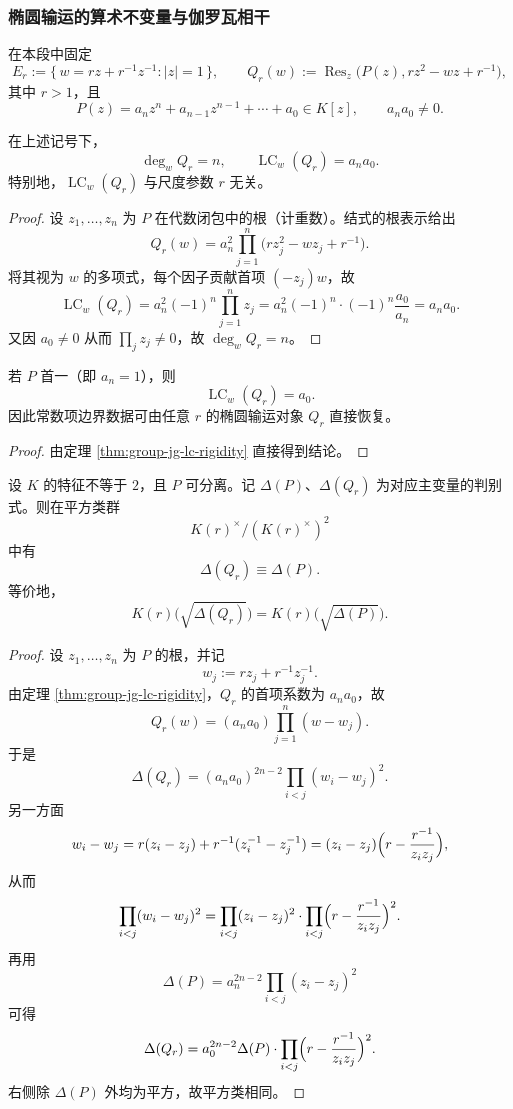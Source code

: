 \subsubsection{椭圆输运的算术不变量与伽罗瓦相干}\label{subsubsec:group-jg-arithmetic-galois-coherence}

在本段中固定
\[
E_r:=\{\,w=r z+r^{-1}z^{-1}:|z|=1\,\},\qquad
Q_r(w):=\operatorname{Res}_{z}\!\bigl(P(z),r z^2-w z+r^{-1}\bigr),
\]
其中 \(r>1\)，且
\[
P(z)=a_n z^n+a_{n-1}z^{n-1}+\cdots+a_0\in K[z],\qquad a_n a_0\neq 0.
\]



\begin{theorem}[输运结式首项系数刚性]\label{thm:group-jg-lc-rigidity}
在上述记号下，
\[
\deg_w Q_r=n,\qquad \operatorname{LC}_w(Q_r)=a_n a_0.
\]
特别地，\(\operatorname{LC}_w(Q_r)\) 与尺度参数 \(r\) 无关。
\end{theorem}
\begin{proof}
设 \(z_1,\dots,z_n\) 为 \(P\) 在代数闭包中的根（计重数）。结式的根表示给出
\[
Q_r(w)=a_n^2\prod_{j=1}^{n}\bigl(r z_j^2-w z_j+r^{-1}\bigr).
\]
将其视为 \(w\) 的多项式，每个因子贡献首项 \((-z_j)w\)，故
\[
\operatorname{LC}_w(Q_r)
=a_n^2(-1)^n\prod_{j=1}^{n}z_j
=a_n^2(-1)^n\cdot(-1)^n\frac{a_0}{a_n}
=a_n a_0.
\]
又因 \(a_0\neq 0\) 从而 \(\prod_j z_j\neq 0\)，故 \(\deg_w Q_r=n\)。
\end{proof}

\begin{corollary}[首一情形的边界系数读出]\label{cor:group-jg-monic-boundary-readout}
若 \(P\) 首一（即 \(a_n=1\)），则
\[
\operatorname{LC}_w(Q_r)=a_0.
\]
因此常数项边界数据可由任意 \(r\) 的椭圆输运对象 \(Q_r\) 直接恢复。
\end{corollary}
\begin{proof}
由定理 \ref{thm:group-jg-lc-rigidity} 直接得到结论。
\end{proof}

\begin{theorem}[判别式平方类守恒]\label{thm:group-jg-discriminant-squareclass}
设 \(K\) 的特征不等于 \(2\)，且 \(P\) 可分离。记 \(\Delta(P)\)、\(\Delta(Q_r)\) 为对应主变量的判别式。则在平方类群
\[
K(r)^\times/(K(r)^\times)^2
\]
中有
\[
\Delta(Q_r)\equiv \Delta(P).
\]
等价地，
\[
K(r)\bigl(\sqrt{\Delta(Q_r)}\bigr)=K(r)\bigl(\sqrt{\Delta(P)}\bigr).
\]
\end{theorem}
\begin{proof}
设 \(z_1,\dots,z_n\) 为 \(P\) 的根，并记
\[
w_j:=r z_j+r^{-1}z_j^{-1}.
\]
由定理 \ref{thm:group-jg-lc-rigidity}，\(Q_r\) 的首项系数为 \(a_n a_0\)，故
\[
Q_r(w)=(a_n a_0)\prod_{j=1}^{n}(w-w_j).
\]
于是
\[
\Delta(Q_r)=(a_n a_0)^{2n-2}\prod_{i<j}(w_i-w_j)^2.
\]
另一方面
\[
w_i-w_j
=r(z_i-z_j)+r^{-1}(z_i^{-1}-z_j^{-1})
=(z_i-z_j)\Bigl(r-\frac{r^{-1}}{z_i z_j}\Bigr),
\]
从而
\[
\prod_{i<j}(w_i-w_j)^2
=\prod_{i<j}(z_i-z_j)^2
\cdot
\prod_{i<j}\Bigl(r-\frac{r^{-1}}{z_i z_j}\Bigr)^2.
\]
再用
\[
\Delta(P)=a_n^{2n-2}\prod_{i<j}(z_i-z_j)^2
\]
可得
\[
\Delta(Q_r)=a_0^{2n-2}\Delta(P)\cdot
\prod_{i<j}\Bigl(r-\frac{r^{-1}}{z_i z_j}\Bigr)^2.
\]
右侧除 \(\Delta(P)\) 外均为平方，故平方类相同。
\end{proof}

